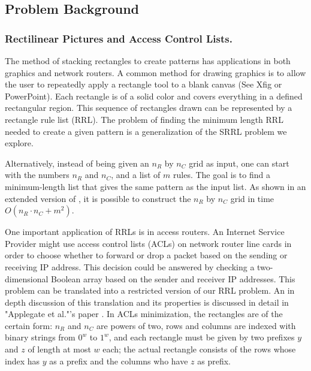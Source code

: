 \subsection{Problem Background}

\subsubsection{Rectilinear Pictures and Access Control Lists.}
The method of stacking rectangles to create patterns has applications in both graphics and network routers.
A common method for drawing graphics is to allow the user to repeatedly apply a rectangle tool to a blank canvas (See Xfig or PowerPoint).
Each rectangle is of a solid color and covers everything in a defined rectangular region.
This sequence of rectangles drawn can be represented by a rectangle rule list (RRL).
The problem of finding the minimum length RRL needed to create a given pattern is a generalization of the SRRL problem we explore.

Alternatively, instead of being given an $n_{R} $ by $n_{C}$ grid as input,
one can start with the numbers $n_{R}$ and $n_{C}$, and a list of $m$ rules.
The goal is to find a minimum-length list that gives the same pattern as the
input list. As shown in an extended version of \cite{ACJKLW07},
it is possible to
construct the $n_{R} $ by $n_{C}$ grid in time $O(n_R \cdot n_C + m^2)$.

One important application of RRLs is in access routers.
An Internet Service Provider might use access control lists (ACLs) on network router line cards in order to choose whether to forward or drop a packet based on the sending or receiving IP address.
This decision could be answered by checking a two-dimensional Boolean array based on the sender and receiver IP addresses.
This problem can be translated into a restricted version of our RRL problem.
An in depth discussion of this translation and its properties is discussed in detail in "Applegate et al."'s paper \cite{ACJKLW07}.
In ACLs minimization, the rectangles are of the certain form:
$n_R$ and $n_C$ are powers of two, rows and columns are
indexed with binary strings
from $0^w$ to $1^w$,  and each rectangle must be given by
two prefixes $y$ and $z$ of length at most $w$ each;
the actual rectangle consists of the rows whose index has
 $y$ as a prefix and the columns who have $z$ as prefix.



